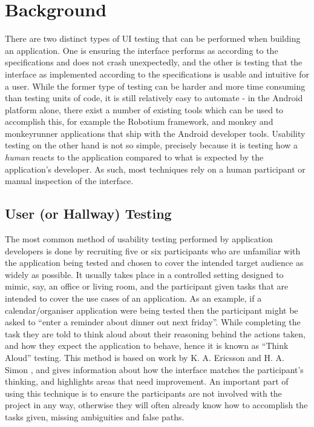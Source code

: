 \chapter{Background}

There are two distinct types of UI testing that can be performed when building
an application. One is ensuring the interface performs as according to the
specifications and does not crash unexpectedly, and the other is testing that
the interface as implemented according to the specifications is usable and
intuitive for a user. While the former type of testing can be harder and more
time consuming than testing units of code, it is still relatively easy to
automate - in the Android platform alone, there exist a number of existing
tools which can be used to accomplish this, for example the Robotium
\cite{robotium} framework, and monkey and monkeyrunner \cite{monkeyrunner}
applications that ship with the Android developer tools. Usability testing on
the other hand is not so simple, precisely because it is testing how
a \emph{human} reacts to the application compared to what is expected by the
application's developer. As such, most techniques rely on a human participant
or manual inspection of the interface.

\section{User (or Hallway) Testing}

The most common method of usability testing performed by application developers
is done by recruiting five or six participants who are unfamiliar with the
application being tested and chosen to cover the intended target audience as
widely as possible. It usually takes place in a controlled setting designed to
mimic, say, an office or living room, and the participant given tasks that are
intended to cover the use cases of an application. As an example, if
a calendar/organiser application were being tested then the participant might
be asked to ``enter a reminder about dinner out next friday''. While completing
the task they are told to think aloud about their reasoning behind the actions
taken, and how they expect the application to behave, hence it is known as
``Think Aloud'' testing. This method is based on work by K. A. Ericsson and H.
A. Simon \cite{ericsson1980verbal}, and gives information about how the
interface matches the participant's thinking, and highlights areas that need
improvement. An important part of using this technique is to ensure the
participants are not involved with the project in any way, otherwise they will
often already know how to accomplish the tasks given, missing ambiguities and
false paths.

